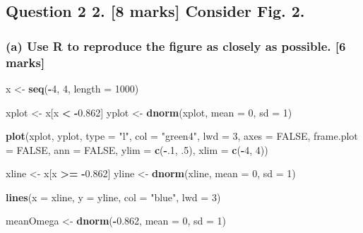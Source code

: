 \documentclass[]{article}
\newenvironment{Shaded}{\begin{snugshade}}{\end{snugshade}}
\newcommand{\KeywordTok}[1]{\textcolor[rgb]{0.13,0.29,0.53}{\textbf{#1}}}
\newcommand{\DataTypeTok}[1]{\textcolor[rgb]{0.13,0.29,0.53}{#1}}
\newcommand{\DecValTok}[1]{\textcolor[rgb]{0.00,0.00,0.81}{#1}}
\newcommand{\FloatTok}[1]{\textcolor[rgb]{0.00,0.00,0.81}{#1}}
\newcommand{\StringTok}[1]{\textcolor[rgb]{0.31,0.60,0.02}{#1}}
\newcommand{\OtherTok}[1]{\textcolor[rgb]{0.56,0.35,0.01}{#1}}
\newcommand{\OperatorTok}[1]{\textcolor[rgb]{0.81,0.36,0.00}{\textbf{#1}}}
\newcommand{\NormalTok}[1]{#1}
\begin{document}
\subsection{Question 2 2. {[}8 marks{]} Consider Fig.
2.}\label{question-2-2.-8-marks-consider-fig.-2.}

\subsubsection{(a) Use R to reproduce the figure as closely as possible.
{[}6
marks{]}}\label{a-use-r-to-reproduce-the-figure-as-closely-as-possible.-6-marks}

\begin{Shaded}
\begin{Highlighting}[]
\NormalTok{x <-}\StringTok{ }\KeywordTok{seq}\NormalTok{(}\OperatorTok{-}\DecValTok{4}\NormalTok{, }\DecValTok{4}\NormalTok{, }\DataTypeTok{length =} \DecValTok{1000}\NormalTok{)}

\NormalTok{xplot <-}\StringTok{ }\NormalTok{x[x }\OperatorTok{<}\StringTok{ }\OperatorTok{-}\FloatTok{0.862}\NormalTok{]}
\NormalTok{yplot <-}\StringTok{ }\KeywordTok{dnorm}\NormalTok{(xplot, }\DataTypeTok{mean =} \DecValTok{0}\NormalTok{, }\DataTypeTok{sd =} \DecValTok{1}\NormalTok{)}

\KeywordTok{plot}\NormalTok{(xplot, yplot, }\DataTypeTok{type =} \StringTok{"l"}\NormalTok{, }\DataTypeTok{col =} \StringTok{"green4"}\NormalTok{, }\DataTypeTok{lwd =} \DecValTok{3}\NormalTok{, }\DataTypeTok{axes =} \OtherTok{FALSE}\NormalTok{, }\DataTypeTok{frame.plot =} \OtherTok{FALSE}\NormalTok{, }\DataTypeTok{ann =} \OtherTok{FALSE}\NormalTok{, }\DataTypeTok{ylim =} \KeywordTok{c}\NormalTok{(}\OperatorTok{-}\NormalTok{.}\DecValTok{1}\NormalTok{, .}\DecValTok{5}\NormalTok{), }\DataTypeTok{xlim =} \KeywordTok{c}\NormalTok{(}\OperatorTok{-}\DecValTok{4}\NormalTok{, }\DecValTok{4}\NormalTok{))}

\NormalTok{xline <-}\StringTok{ }\NormalTok{x[x }\OperatorTok{>=}\StringTok{ }\OperatorTok{-}\FloatTok{0.862}\NormalTok{]}
\NormalTok{yline <-}\StringTok{ }\KeywordTok{dnorm}\NormalTok{(xline, }\DataTypeTok{mean =} \DecValTok{0}\NormalTok{, }\DataTypeTok{sd =} \DecValTok{1}\NormalTok{)}

\KeywordTok{lines}\NormalTok{(}\DataTypeTok{x =}\NormalTok{ xline, }\DataTypeTok{y =}\NormalTok{ yline, }\DataTypeTok{col =} \StringTok{"blue"}\NormalTok{, }\DataTypeTok{lwd =} \DecValTok{3}\NormalTok{)}


\NormalTok{meanOmega <-}\StringTok{ }\KeywordTok{dnorm}\NormalTok{(}\OperatorTok{-}\FloatTok{0.862}\NormalTok{, }\DataTypeTok{mean =} \DecValTok{0}\NormalTok{, }\DataTypeTok{sd =} \DecValTok{1}\NormalTok{)}


\end{Highlighting}
\end{Shaded}
\end{document}
